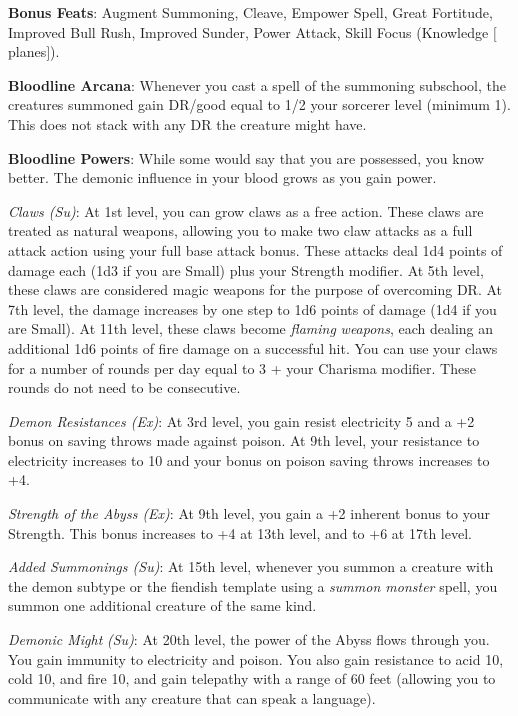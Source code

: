\textbf{Bonus Feats}: Augment Summoning, Cleave, Empower Spell, Great Fortitude, Improved Bull Rush, Improved Sunder, Power Attack,
Skill Focus (Knowledge \mbox{$[$}planes\mbox{$]$}).
				
\textbf{Bloodline Arcana}: Whenever you cast a spell of the summoning subschool, the creatures summoned gain DR/good equal to 1/2
your sorcerer level (minimum 1). This does not stack with any DR the creature might have.
				
\textbf{Bloodline Powers}: While some would say that you are possessed, you know better. The demonic influence in your blood grows 
as you gain power.
				
\textit{Claws (Su)}: At 1st level, you can grow claws as a free action. These claws are treated as natural weapons, allowing you to
make two claw attacks as a full attack action using your full base attack bonus. These attacks deal 1d4 points of damage each 
(1d3 if you are Small) plus your Strength modifier. At 5th level, these claws are considered magic weapons for the purpose of 
overcoming DR. At 7th level, the damage increases by one step to 1d6 points of damage (1d4 if you are Small). At 11th level, 
these claws become \textit{flaming} \textit{weapons}, each dealing an additional 1d6 points of fire damage on a successful hit. 
You can use your claws for a number of rounds per day equal to 3 + your Charisma modifier. These rounds do not need to be consecutive.
				
\textit{Demon Resistances (Ex)}: At 3rd level, you gain resist electricity 5 and a +2 bonus on saving throws made against poison. 
At 9th level, your resistance to electricity increases to 10 and your bonus on poison saving throws increases to +4.
				
\textit{Strength of the Abyss (Ex)}: At 9th level, you gain a +2 inherent bonus to your Strength. This bonus increases to +4 at 
13th level, and to +6 at 17th level.
				
\textit{Added Summonings (Su)}: At 15th level, whenever you summon a creature with the demon subtype or the fiendish template 
using a \textit{summon monster} spell, you summon one additional creature of the same kind.
				
\textit{Demonic Might} \textit{(Su)}: At 20th level, the power of the Abyss flows through you. You gain immunity to electricity 
and poison. You also gain resistance to acid 10, cold 10, and fire 10, and gain telepathy with a range of 60 feet (allowing you 
to communicate with any creature that can speak a language).
				
